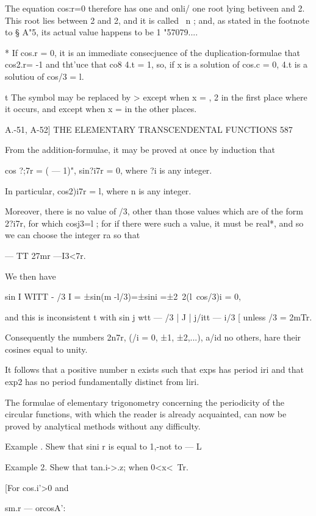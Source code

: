The equation cos:r=0 therefore has one and onli/ one root lying betiveen and 2. This 
root lies between  2 and 2, and it is called \ n ; and, as stated in the footnote to § A"5, its 
actual value happens to be 1 "57079.... 

* If cos.r = 0, it is an immediate consecjuence of the duplication-formulae that cos2.r= -1 
and tht'uce that co8 4.t = 1, so, if x is a solution of cos.c = 0, 4.t is a solutiou of cos/3 = l. 

t The symbol   may be replaced by > except when x = , 2 in the first place where it occurs, 
and except when x = in the other places. 



A.-51, A-52] THE ELEMENTARY TRANSCENDENTAL FUNCTIONS 587 

From the addition-formulae, it may be proved at once by induction that 

cos ?;7r = ( — 1)", sin?i7r = 0, 
where ?i is any integer. 

In particular, cos2)i7r = l, where n is any integer. 

Moreover, there is no value of /3, other than those values which are of the form 2?i7r, 
for which cosj3=l ; for if there were such a value, it must be real*, and so we can 
choose the integer ra so that 

— TT  27mr —I3<7r. 

We then have 

sin I WITT -  /3 I = ±sin(m  -l/3)=±sini =±2~2(l\ cos/3)i = 0, 

and this is inconsistent t with sin j wtt —  /3 |   J | j/itt — i/3 [ unless /3 = 2mTr. 

Consequently the numbers 2n7r, (/i = 0, ±1, ±2,...), a/id no others, hare their cosines 
equal to unity. 

It follows that a positive number n exists such that exps has period  iri and that 
exp2 has no period fundamentally distinct from liri. 

The formulae of elementary trigonometry concerning the periodicity of the circular 
functions, with which the reader is already acquainted, can now be proved by analytical 
methods without any difficulty. 

Example .  Shew that sini r is equal to 1,-not to — L 

Example 2. Shew that tan.i->.z; when 0<x<\ Tr. 

[For cos.i'>0 and 



sm.r — orcosA': 



